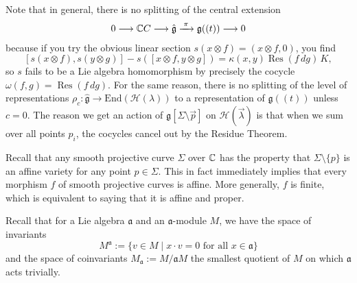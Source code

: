 \documentclass[12pt]{article}
\begin{document}
\begin{remark}
    Note that in general, there is no splitting of the central extension \begin{align*}
        0 \longrightarrow \mathbb{C} C
        \longrightarrow \hat{\mathfrak g}
        \xrightarrow{\;\pi\;}
        \mathfrak g((t))
        \longrightarrow 0
    \end{align*} because if you try the obvious linear section $s(x\otimes f)=(x\otimes f,0)$, you find
    \[
        [s(x\otimes f),s(y\otimes g)] - s([x\otimes f,y\otimes g]) = \kappa(x,y)\operatorname{Res}(f\,dg)\,K,
    \]
    so $s$ fails to be a Lie algebra homomorphism by precisely the cocycle $\omega(f,g)=\operatorname{Res}(f\,dg)$. For the same reason, there is no splitting of the level of representations $\rho_c \colon \hat{\mathfrak g} \to \mathrm{End}(\mathcal{H}(\lambda))$ to a representation of $\mathfrak g((t))$ unless $c=0$. The reason we get an action of $\mathfrak{g}[\Sigma\setminus\vec{p}]$ on $\mathcal{H}(\vec{\lambda})$ is that when we sum over all points $p_i$, the cocycles cancel out by the Residue Theorem.
\end{remark}

\begin{remark}
    Recall that any smooth projective curve $\Sigma$ over $\mathbb{C}$ has the property that $\Sigma \setminus \{p\}$ is an affine variety for any point $p \in \Sigma$. This in fact immediately implies that every morphism $f$ of smooth projective curves is affine. More generally, $f$ is finite, which is equivalent to saying that it is affine and proper.


\end{remark}

Recall that for a Lie algebra $\mathfrak{a}$ and an $\mathfrak{a}$-module $M$, we have the space of invariants
\[M^{\mathfrak{a}} := \{v \in M \mid x\cdot v = 0 \text{ for all } x \in \mathfrak{a}\}\] and the space of coinvariants
$M_{\mathfrak{a}} := M / \mathfrak{a}M$ the smallest quotient of $M$ on which $\mathfrak{a}$ acts trivially.
\end{document}
